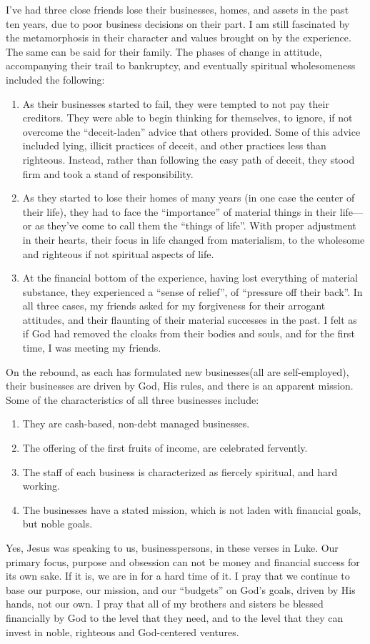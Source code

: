 \documentclass[12pt]{memoir}
\begin{document}
I've had three close friends lose their businesses, homes, and assets
in the past ten years, due to poor business decisions on their part.
I am still fascinated by the metamorphosis in their character and
values brought on by the experience. The same can be said for their
family. The phases of change in attitude, accompanying their trail
to bankruptcy, and eventually spiritual wholesomeness included the
following:
\begin{enumerate}
\item As their businesses started to fail, they were tempted to not pay
their creditors. They were able to begin thinking for themselves,
to ignore, if not overcome the ``deceit-laden'' advice that others
provided. Some of this advice included lying, illicit practices of
deceit, and other practices less than righteous. Instead, rather than
following the easy path of deceit, they stood firm and took a stand
of responsibility. 
\item As they started to lose their homes of many years (in one case the
center of their life), they had to face the ``importance'' of material
things in their life---or as they've come to call them the ``things
of life''. With proper adjustment in their hearts, their focus in
life changed from materialism, to the wholesome and righteous if not
spiritual aspects of life.  
\item At the financial bottom of the experience, having lost everything
of material substance, they experienced a ``sense of relief'', of
``pressure off their back''. In all three cases, my friends asked
for my forgiveness for their arrogant attitudes, and their flaunting
of their material successes in the past. I felt as if God had removed
the cloaks from their bodies and souls, and for the first time, I
was meeting my friends. 
\end{enumerate}
On the rebound, as each has formulated new businesses(all are self-employed),
their businesses are driven by God, His rules, and there is an apparent
mission. Some of the characteristics of all three businesses include:
\begin{enumerate}
\item They are cash-based, non-debt managed businesses.  
\item The offering of the first fruits of income, are celebrated fervently. 
\item The staff of each business is characterized as fiercely spiritual,
and hard working. 
\item The businesses have a stated mission, which is not laden with financial
goals, but noble goals. 
\end{enumerate}
Yes, Jesus was speaking to us, businesspersons, in these verses in
Luke. Our primary focus, purpose and obsession can not be money and
financial success for its own sake. If it is, we are in for a hard
time of it. I pray that we continue to base our purpose, our mission,
and our ``budgets'' on God's goals, driven by His hands, not our
own. I pray that all of my brothers and sisters be blessed financially
by God to the level that they need, and to the level that they can
invest in noble, righteous and God-centered ventures.
\end{document}
